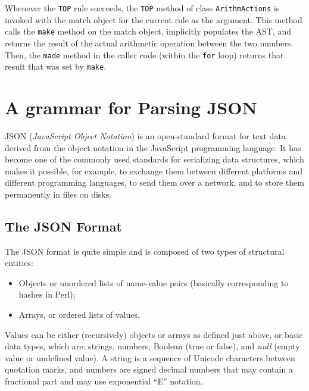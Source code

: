 Whenever the {\tt TOP} rule succeeds, the {\tt TOP} method 
of class {\tt ArithmActions} is invoked with the match 
object for the current rule as the argument.  This method 
calls the {\tt make} method on the match object, implicitly 
populates the AST, and returns the result of the actual 
arithmetic operation between the two numbers. Then, the 
{\tt made} method in the caller code (within the 
{\tt for} loop) returns that result that was set by {\tt make}.

\section{A grammar for Parsing JSON}

JSON (\emph{JavaScript Object Notation}) is an 
open-standard format for text data derived from 
the object notation in the JavaScript programming language. 
It has become one of the commonly used standards for 
serializing data structures, which makes it possible, for 
example, to exchange them between different platforms and 
different programming languages, to send them over a network, 
and to store them permanently in files on disks.

\subsection{The JSON Format}

The JSON format is quite simple and is composed of two types 
of structural entities:
\begin{itemize}
\item Objects or unordered lists of name-value pairs 
(basically corresponding to hashes in Perl);
\item Arrays, or ordered lists of values.
\end{itemize}

Values can be either (recursively) objects or arrays 
as defined just above, or basic data types, which are: 
strings, numbers, Boolean (true or false), and \emph{null} 
(empty value or undefined value). A string is a sequence 
of Unicode characters between quotation marks, and numbers 
are signed decimal numbers that may contain a fractional 
part and may use exponential ``E'' notation.

